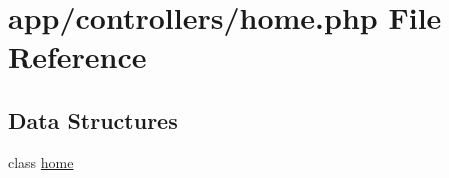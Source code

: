 \hypertarget{controllers_2home_8php}{}\section{app/controllers/home.php File Reference}
\label{controllers_2home_8php}
\subsection*{Data Structures}
\begin{DoxyCompactItemize}
\item 
class \hyperlink{classhome}{home}
\end{DoxyCompactItemize}
